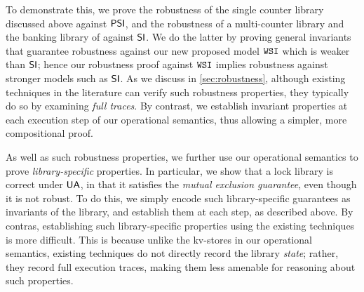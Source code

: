 To demonstrate this, we prove the robustness of the single
counter library discussed above against \(\mathsf{PSI}\), 
and the robustness of a multi-counter library and the banking library of \citet{bank-example-wsi}
against \(\mathsf{SI}\).
We do the latter by proving general invariants that guarantee robustness against our new proposed model \( \mathtt{WSI} \) which is weaker than $\mathsf{SI}$; hence our robustness proof against $\mathtt{WSI}$ implies robustness against stronger models such as  \( \mathsf{SI} \).
As we discuss in \cref{sec:robustness}, although existing techniques in the literature can verify such robustness properties, they typically do so by examining \emph{full traces}.
By contrast, we establish invariant properties at each execution step of our operational semantics, thus allowing a simpler, more compositional proof. 


As well as such robustness properties, we further use our operational semantics to prove \emph{library-specific} properties. 
In particular, we show that a lock library is correct under \( \mathsf{UA} \), in that it satisfies the \emph{mutual exclusion guarantee}, 
even though it is not robust.
To do this, we simply encode such library-specific guarantees as invariants of the library, and establish them at each step, as described above. 
By contras, establishing such library-specific properties using the existing techniques is more difficult. 
This is because unlike the kv-stores in our operational semantics, existing techniques do not directly record the library \emph{state}; 
rather, they record full execution traces, making them less amenable for reasoning about such properties.


%
